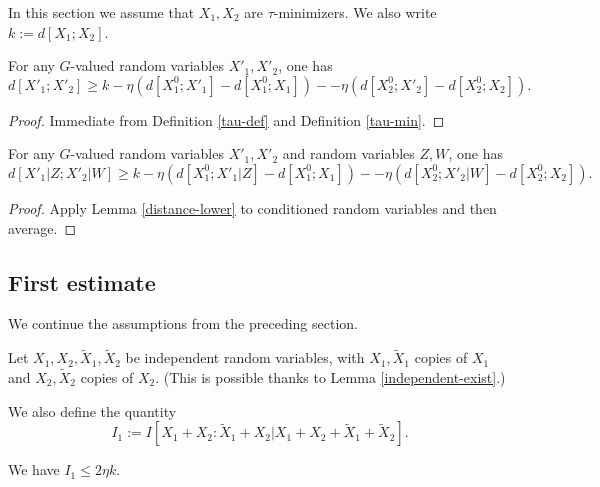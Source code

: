 In this section we assume that $X_1,X_2$ are $\tau$-minimizers. We also write $k := d[X_1;X_2]$.

\begin{lemma}\label{distance-lower}
  For any $G$-valued random variables $X'_1,X'_2$, one has
$$ d[X'_1;X'_2] \geq k - \eta (d[X^0_1;X'_1] - d[X^0_1;X_1] ) - - \eta (d[X^0_2;X'_2] - d[X^0_2;X_2] ).$$
\end{lemma}

\begin{proof}
  Immediate from Definition \ref{tau-def} and Definition \ref{tau-min}.
\end{proof}

\begin{lemma}\label{cond-distance-lower}
  For any $G$-valued random variables $X'_1,X'_2$ and random variables $Z,W$, one has
$$ d[X'_1|Z;X'_2|W] \geq k - \eta (d[X^0_1;X'_1|Z] - d[X^0_1;X_1] ) - - \eta (d[X^0_2;X'_2|W] - d[X^0_2;X_2] ).$$
\end{lemma}

\begin{proof}  Apply Lemma \ref{distance-lower} to conditioned random variables and then average.
\end{proof}

\subsection{First estimate}

We continue the assumptions from the preceding section.

Let $X_1, X_2, \tilde X_1, \tilde X_2$ be independent random variables, with $X_1,\tilde X_1$ copies of $X_1$ and $X_2,\tilde X_2$ copies of $X_2$.  (This is possible thanks to Lemma \ref{independent-exist}.)

We also define the quantity
$$ I_1 :=  I [ X_1+X_2 : \tilde X_1 + X_2 | X_1+X_2+\tilde X_1+\tilde X_2 ].$$


\begin{lemma}\label{first-estimate}
   We have $I_1 \leq 2 \eta k$.
\end{lemma}


